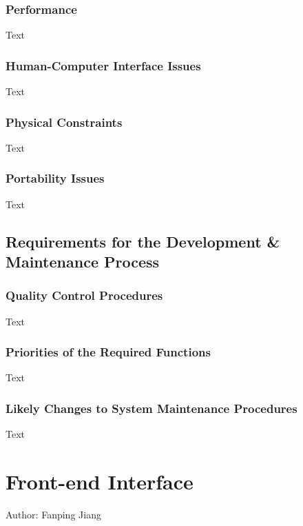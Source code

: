 \documentclass[12pt]{article}
\begin{document}
\subsubsection {Performance}

Text

\subsubsection {Human-Computer Interface Issues}

Text

\subsubsection {Physical Constraints}

Text

\subsubsection {Portability Issues}

Text

\subsection{Requirements for the Development \& Maintenance Process}

\subsubsection {Quality Control Procedures}

Text

\subsubsection {Priorities of the Required Functions}

Text

\subsubsection {Likely Changes to System Maintenance Procedures}

Text

\section{Front-end Interface}
Author: Fanping Jiang\\
\end{document}
